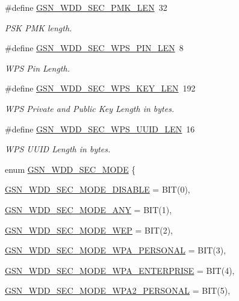 \begin{DoxyCompactItemize}
\#define \hyperlink{a00604_aae41cfc2009ee669de847fcc20cc8a89}{GSN\_\-WDD\_\-SEC\_\-PMK\_\-LEN}~32
\begin{DoxyCompactList}\small\item\em PSK PMK length. \end{DoxyCompactList}\item 
\#define \hyperlink{a00604_a0543ca4fa6aef9e51599f017617e33f7}{GSN\_\-WDD\_\-SEC\_\-WPS\_\-PIN\_\-LEN}~8
\begin{DoxyCompactList}\small\item\em WPS Pin Length. \end{DoxyCompactList}\item 
\#define \hyperlink{a00604_ab538c64b36b514b7b60ca80f37a5b9f0}{GSN\_\-WDD\_\-SEC\_\-WPS\_\-KEY\_\-LEN}~192
\begin{DoxyCompactList}\small\item\em WPS Private and Public Key Length in bytes. \end{DoxyCompactList}\item 
\#define \hyperlink{a00604_afe238c1f37fdcbfd10782721ac17bdfa}{GSN\_\-WDD\_\-SEC\_\-WPS\_\-UUID\_\-LEN}~16
\begin{DoxyCompactList}\small\item\em WPS UUID Length in bytes. \end{DoxyCompactList}\item 
enum \hyperlink{a00604_a1bc8fa529d709c2a8a87aee6038fb7ec}{GSN\_\-WDD\_\-SEC\_\-MODE} \{ \par
\hyperlink{a00604_a1bc8fa529d709c2a8a87aee6038fb7eca249e6dd79026205da4f5c39c3ada48a1}{GSN\_\-WDD\_\-SEC\_\-MODE\_\-DISABLE} =  BIT(0), 
\par
\hyperlink{a00604_a1bc8fa529d709c2a8a87aee6038fb7ecabc23a52453e87dd40ebccfaa8a3262b5}{GSN\_\-WDD\_\-SEC\_\-MODE\_\-ANY} =  BIT(1), 
\par
\hyperlink{a00604_a1bc8fa529d709c2a8a87aee6038fb7eca43baa8602e403e63e4b59d3dd5d43021}{GSN\_\-WDD\_\-SEC\_\-MODE\_\-WEP} =  BIT(2), 
\par
\hyperlink{a00604_a1bc8fa529d709c2a8a87aee6038fb7ecae09bcc425e00171bcca5694b587c50d9}{GSN\_\-WDD\_\-SEC\_\-MODE\_\-WPA\_\-PERSONAL} =  BIT(3), 
\par
\hyperlink{a00604_a1bc8fa529d709c2a8a87aee6038fb7eca544dbf7fe51f4eb4c3310ad9b63185ee}{GSN\_\-WDD\_\-SEC\_\-MODE\_\-WPA\_\-ENTERPRISE} =  BIT(4), 
\par
\hyperlink{a00604_a1bc8fa529d709c2a8a87aee6038fb7eca4bd0ebdd88069db215dff62e5c34f60c}{GSN\_\-WDD\_\-SEC\_\-MODE\_\-WPA2\_\-PERSONAL} =  BIT(5), 

\end{DoxyCompactItemize}
